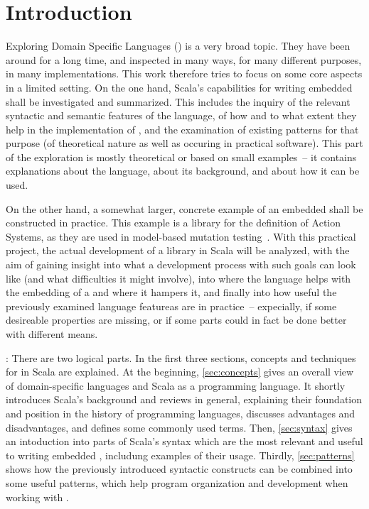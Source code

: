 {}
\chapter*{Introduction}

Exploring Domain Specific Languages (\dsls{}) is a very broad topic. They have been around for a
long time, and inspected in many ways, for many different purposes, in many implementations. This
work therefore tries to focus on some core aspects in a limited setting. On the one hand, Scala's
capabilities for writing embedded \dsls{} shall be investigated and summarized. This includes the
inquiry of the relevant syntactic and semantic features of the language, of how and to what extent
they help in the implementation of \dsls{}, and the examination of existing patterns for that
purpose (of theoretical nature as well as occuring in practical software). This part of the
exploration is mostly theoretical or based on small examples~-- it contains explanations about the
language, about its background, and about how it can be used.

On the other hand, a somewhat larger, concrete example of an embedded \dsl{} shall be constructed in
practice. This example is a library for the definition of Action Systems, as they are used in
model-based mutation testing~\cite{aichernig2014:killing,aichernig2009:mutation}. With this
practical project, the actual development of a \dsl{} library in Scala will be analyzed, with the
aim of gaining insight into what a development process with such goals can look like (and what
difficulties it might involve), into where the language helps with the embedding of a \dsl{} and
where it hampers it, and finally into how useful the previously examined language featureas are in
practice~-- expecially, if some desireable properties are missing, or if some parts could in fact be
done better with different means.

: There are two logical parts. In the first three
sections, concepts and techniques for \dsls{} in Scala are explained.  At the beginning,
\autoref{sec:concepts} gives an overall view of domain-specific languages and Scala as a programming
language. It shortly introduces Scala's background and reviews \dsls{} in general, explaining their
foundation and position in the history of programming languages, discusses advantages and
disadvantages, and defines some commonly used terms. Then, \autoref{sec:syntax} gives an intoduction
into parts of Scala's syntax which are the most relevant and useful to writing embedded \dsls{},
includung examples of their usage. Thirdly, \autoref{sec:patterns} shows how the previously
introduced syntactic constructs can be combined into some useful patterns, which help program
organization and development when working with \dsls{}.

